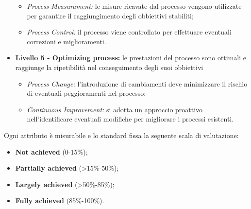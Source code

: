 \begin{itemize}
		\begin{itemize}
	 		\item \textit{Process Measurament:} le misure ricavate dal processo vengono utilizzate per garantire il raggiungimento degli obbiettivi stabiliti;
	 		\item \textit{Process Control:} il processo viene controllato per effettuare eventuali correzioni e miglioramenti.
	 	\end{itemize}
	\item \textbf{Livello 5 - Optimizing process:} le prestazioni del processo sono ottimali e raggiunge la ripetibilità nel conseguimento degli suoi obbiettivi
	 	\begin{itemize}
	 		\item \textit{Process Change:} l'introduzione di cambiamenti deve minimizzare il rischio di eventuali peggioramenti nel processo;
	 		\item \textit{Continuous Improvement:} si adotta un approccio proattivo nell'identificare eventuali modifiche per migliorare i processi esistenti.
	 	\end{itemize}
\end{itemize}
Ogni attributo è misurabile e lo standard fissa la seguente scala di valutazione:
\begin{itemize}
	\item \textbf{Not achieved} (0-15\%);
	\item \textbf{Partially achieved} (>15\%-50\%);
	\item \textbf{Largely achieved} (>50\%-85\%);
	\item \textbf{Fully achieved} (85\%-100\%).
\end{itemize}

